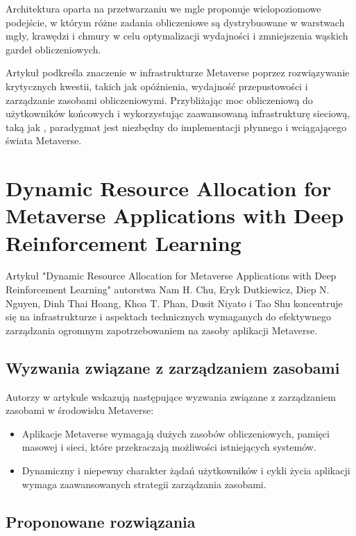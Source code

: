 \newpage
Architektura oparta na przetwarzaniu we mgle proponuje wielopoziomowe podejście, w którym różne zadania obliczeniowe są dystrybuowane w warstwach mgły, krawędzi i chmury w celu optymalizacji wydajności i zmniejszenia wąskich gardeł obliczeniowych.

Artykuł podkreśla znaczenie  w infrastrukturze Metaverse poprzez rozwiązywanie krytycznych kwestii, takich jak opóźnienia, wydajność przepustowości i zarządzanie zasobami obliczeniowymi. Przybliżając moc obliczeniową do użytkowników końcowych i wykorzystując zaawansowaną infrastrukturę sieciową, taką jak , paradygmat  jest niezbędny do implementacji płynnego i wciągającego świata Metaverse.

\section{Dynamic Resource Allocation for Metaverse Applications with Deep Reinforcement Learning}

Artykuł "Dynamic Resource Allocation for Metaverse Applications with Deep Reinforcement Learning" autorstwa Nam H. Chu,
Eryk Dutkiewicz, Diep N. Nguyen, Dinh Thai Hoang, Khoa T. Phan, Dusit Niyato i Tao Shu koncentruje się na infrastrukturze i aspektach technicznych wymaganych do efektywnego zarządzania ogromnym zapotrzebowaniem na zasoby aplikacji Metaverse.

\subsection{Wyzwania związane z zarządzaniem zasobami}

Autorzy w artykule wskazują następujące wyzwania związane z zarządzaniem zasobami w środowisku Metaverse:

\begin{itemize}
    \item Aplikacje Metaverse wymagają dużych zasobów obliczeniowych, pamięci masowej i sieci, które przekraczają możliwości istniejących systemów.
    \item Dynamiczny i niepewny charakter żądań użytkowników i cykli życia aplikacji wymaga zaawansowanych strategii zarządzania zasobami.
\end{itemize}

\subsection{Proponowane rozwiązania}

